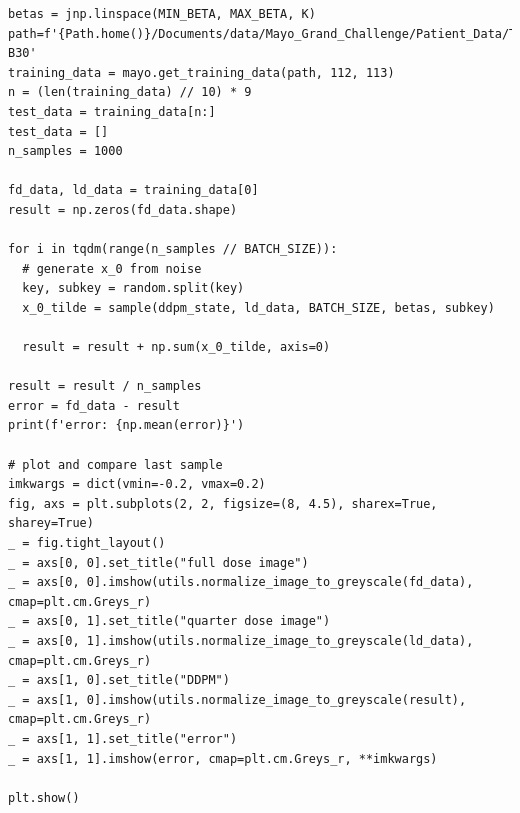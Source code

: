 \documentclass[a4paper, 11pt]{article}
\begin{document}
\begin{verbatim}
betas = jnp.linspace(MIN_BETA, MAX_BETA, K)
path=f'{Path.home()}/Documents/data/Mayo_Grand_Challenge/Patient_Data/Training_Image_Data/3mm B30'
training_data = mayo.get_training_data(path, 112, 113)
n = (len(training_data) // 10) * 9
test_data = training_data[n:]
test_data = []
n_samples = 1000

fd_data, ld_data = training_data[0]
result = np.zeros(fd_data.shape)

for i in tqdm(range(n_samples // BATCH_SIZE)):
  # generate x_0 from noise
  key, subkey = random.split(key)
  x_0_tilde = sample(ddpm_state, ld_data, BATCH_SIZE, betas, subkey)

  result = result + np.sum(x_0_tilde, axis=0)

result = result / n_samples
error = fd_data - result
print(f'error: {np.mean(error)}')

# plot and compare last sample
imkwargs = dict(vmin=-0.2, vmax=0.2)
fig, axs = plt.subplots(2, 2, figsize=(8, 4.5), sharex=True, sharey=True)
_ = fig.tight_layout()
_ = axs[0, 0].set_title("full dose image")
_ = axs[0, 0].imshow(utils.normalize_image_to_greyscale(fd_data), cmap=plt.cm.Greys_r)
_ = axs[0, 1].set_title("quarter dose image")
_ = axs[0, 1].imshow(utils.normalize_image_to_greyscale(ld_data), cmap=plt.cm.Greys_r)
_ = axs[1, 0].set_title("DDPM")
_ = axs[1, 0].imshow(utils.normalize_image_to_greyscale(result), cmap=plt.cm.Greys_r)
_ = axs[1, 1].set_title("error")
_ = axs[1, 1].imshow(error, cmap=plt.cm.Greys_r, **imkwargs)

plt.show()
\end{verbatim}
\end{document}
